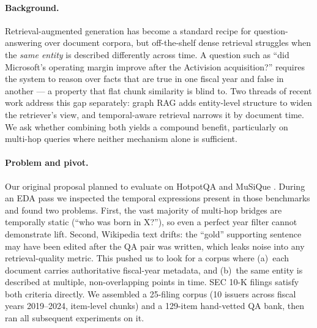 \documentclass[11pt]{article}
\begin{document}
\paragraph{Background.}
Retrieval-augmented generation \citep{lewis2020retrieval} has become
a standard recipe for question-answering over document corpora, but
off-the-shelf dense retrieval struggles when the \emph{same entity}
is described differently across time. A question such as ``did
Microsoft's operating margin improve after the Activision acquisition?''
requires the system to reason over facts that are true in one fiscal
year and false in another --- a property that flat chunk similarity is
blind to. Two threads of recent work address this gap separately: graph
RAG \citep{edge2024graphrag,zhu2025kg2rag} adds entity-level structure
to widen the retriever's view, and temporal-aware retrieval
\citep{tempagent2025} narrows it by document time. We ask whether
combining both yields a compound benefit, particularly on multi-hop
queries where neither mechanism alone is sufficient.

\paragraph{Problem and pivot.}
Our original proposal planned to evaluate on HotpotQA
\citep{yang2018hotpotqa} and MuSiQue \citep{trivedi2022musique}. During
an EDA pass we inspected the temporal expressions present in those
benchmarks and found two problems. First, the vast majority of
multi-hop bridges are temporally static (``who was born in X?''), so
even a perfect year filter cannot demonstrate lift. Second, Wikipedia
text drifts: the ``gold'' supporting sentence may have been edited
after the QA pair was written, which leaks noise into any
retrieval-quality metric. This pushed us to look for a corpus where
(a)~each document carries authoritative fiscal-year metadata, and
(b)~the same entity is described at multiple, non-overlapping points in
time. SEC 10-K filings satisfy both criteria directly. We assembled a
25-filing corpus (10 issuers across fiscal years 2019--2024, item-level
chunks) and a 129-item hand-vetted QA bank, then ran all subsequent
experiments on it.
\end{document}
